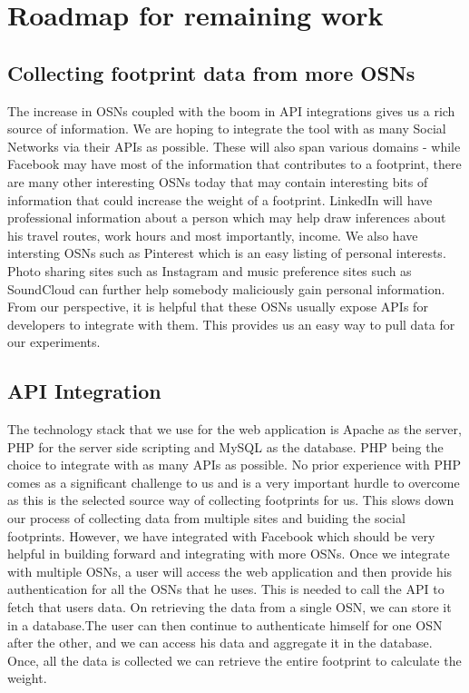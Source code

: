 \documentclass[12pt,conference]{IEEEtran}
\begin{document}
\section{Roadmap for remaining work}
\subsection{Collecting footprint data from more OSNs}
The increase in OSNs coupled with the boom in API integrations gives us a rich source of information. We are hoping to integrate the tool with as many Social Networks via their APIs as possible. These will also span various domains - while Facebook may have most of the information that contributes to a footprint, there are many other interesting OSNs today that may contain interesting bits of information that could increase the weight of a footprint. LinkedIn will have professional information about a person which may help draw inferences about his travel routes, work hours and most importantly, income. We also have intersting OSNs such as Pinterest which is an easy listing of personal interests. Photo sharing sites such as Instagram and music preference sites such as SoundCloud can further help somebody maliciously gain personal information. From our perspective, it is helpful that these OSNs usually expose APIs for developers to integrate with them. This provides us an easy way to pull data for our experiments.
\subsection{API Integration}
The technology stack that we use for the web application is Apache as the server, PHP for the server side scripting and MySQL as the database. PHP being the choice to integrate with as many APIs as possible. No prior experience with PHP comes as a significant challenge to us and is a very important hurdle to overcome as this is the selected source way of collecting footprints for us. This slows down our process of collecting data from multiple sites and buiding the social footprints. However, we have integrated with Facebook which should be very helpful in building forward and integrating with more OSNs. Once we integrate with multiple OSNs, a user will access the web application and then provide his authentication for all the OSNs that he uses. This is needed to call the API to fetch that users data. On retrieving the data from a single OSN, we can store it in a database.The user can then continue to authenticate himself for one OSN after the other, and we can access his data and aggregate it in the database. Once, all the data is collected we can retrieve the entire footprint to calculate the weight.
\end{document}
